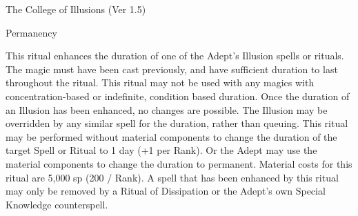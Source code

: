 \begin{Chapter}{The College of Illusions (Ver 1.5)}
\begin{ritual}[R-3]{Permanency}
\begin{effects}
This ritual enhances the duration of one of the Adept’s Illusion
spells or rituals.  The magic must have been cast previously, and have
sufficient duration to last throughout the ritual.  This ritual may
not be used with any magics with concentration-based or indefinite,
condition based duration.  Once the duration of an Illusion has been
enhanced, no changes are possible. The Illusion may be overridden by
any similar spell for the duration, rather than queuing.  This ritual
may be performed without material components to change the duration of
the target Spell or Ritual to 1 day (+1 per Rank).  Or the Adept may
use the material components to change the duration to permanent.
Material costs for this ritual are 5,000 sp (200 / Rank).  A spell
that has been enhanced by this ritual may only be removed by a Ritual
of Dissipation or the Adept’s own Special Knowledge counterspell.
\end{effects}
\end{ritual}
\end{Chapter}
